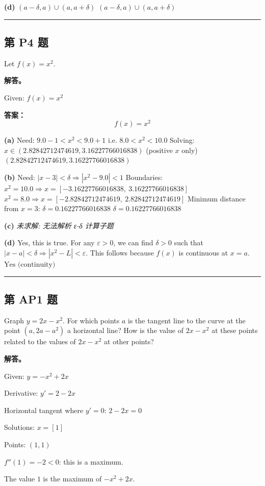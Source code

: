 \documentclass[12pt, a4paper]{article}
\newcommand{\problem}[1]{\subsection*{第 #1 题}}
\newcommand{\solution}{\textbf{解答。}}
\begin{document}
\textbf{(d)}
$(a - \delta, a) \cup (a, a + \delta)$
$\boxed{(a - \delta, a) \cup (a, a + \delta)}$

\vspace{0.8em}
\hrule
\vspace{0.8em}

\problem{P4}

Let $f(x) = x^2$.

\solution

Given: $f(x) = x^{2}$

\textbf{答案：}
\[\boxed{f(x) = x^{2}}\]

\textbf{(a)}
Need: $9.0 - 1 < x^{2} < 9.0 + 1$
i.e. $8.0 < x^{2} < 10.0$
Solving: $x \in (2.82842712474619, 3.16227766016838)$ (positive $x$ only)
$\boxed{(2.82842712474619, 3.16227766016838)}$

\textbf{(b)}
Need: $|x - 3| < \delta \Rightarrow |x^{2} - 9.0| < 1$
Boundaries: $x^{2} = 10.0 \Rightarrow x = \left[ -3.16227766016838, \  3.16227766016838\right]$
           $x^{2} = 8.0 \Rightarrow x = \left[ -2.82842712474619, \  2.82842712474619\right]$
Minimum distance from $x = 3$: $\delta = 0.16227766016838$
$\boxed{\delta = 0.16227766016838}$

\textbf{(c)}
\textit{\color{warnred} 未求解: 无法解析 ε-δ 计算子题}

\textbf{(d)}
Yes, this is true.
For any $\varepsilon > 0$, we can find $\delta > 0$ such that
$|x - a| < \delta \Rightarrow |x^{2} - L| < \varepsilon$.
This follows because $f(x)$ is continuous at $x = a$.
$\boxed{\text{Yes (continuity)}}$

\vspace{0.8em}
\hrule
\vspace{0.8em}

\problem{AP1}

Graph $y = 2x - x^2$. For which points $a$ is the tangent line to the curve at the point $(a, 2a - a^2)$ a horizontal line? How is the value of $2x - x^2$ at these points related to the values of $2x - x^2$ at other points?

\solution

Given: $y = - x^{2} + 2 x$

Derivative: $y' = 2 - 2 x$

Horizontal tangent where $y' = 0$: $2 - 2 x = 0$

Solutions: $x = \left[ 1\right]$

Points: $(1, 1)$

$f''(1) = -2 < 0$: this is a maximum.

The value $1$ is the maximum of $- x^{2} + 2 x$.
\end{document}
